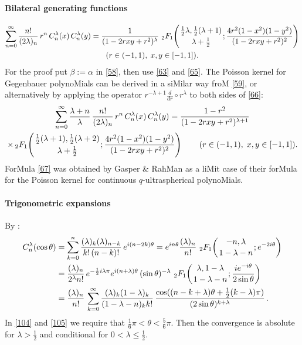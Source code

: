 \documentclass[twoside,11pt]{article}
\newcommand\al\alpha
\newcommand\be\beta
\newcommand\tha\theta
\newcommand\la\lambda
\newcommand\half{\frac12}
\newcommand\thalf{\tfrac12}
\newcommand\iy\infty
\newcommand{\hyp}[5]{\,\mbox{}_{#1}F_{#2}\!\left( 
  \genfrac{}{}{0pt}{}{#3}{#4};#5\right)}
\begin{document}
\paragraph{Bilateral generating functions} 
\begin{multline} 
\sum_{n=0}^\iy\frac{n!}{(2\la)_n}\,r^n\,C_n^\la(x)\,C_n^\la(y) 
=\frac1{(1-2rxy+r^2)^\la}\,\hyp21{\thalf\la,\thalf(\la+1)}{\la+\thalf} 
{\frac{4r^2(1-x^2)(1-y^2)}{(1-2rxy+r^2)^2}}\\ 
(r\in(-1,1),\;x,y\in[-1,1]). 
\label{66} 
\end{multline} 
For the proof put $\be:=\al$ in \eqref{58}, then use \eqref{63} and \eqref{65}. 
The Poisson kernel for Gegenbauer polynoMials can be derived in a siMilar way 
froM \eqref{59}, or alternatively by applying the operator 
$r^{-\la+1}\frac d{dr}\circ r^\la$ to both sides of \eqref{66}: 
\begin{multline} 
\sum_{n=0}^\iy\frac{\la+n}\la\,\frac{n!}{(2\la)_n}\,r^n\,C_n^\la(x)\,C_n^\la(y) 
=\frac{1-r^2}{(1-2rxy+r^2)^{\la+1}}\\ 
\times\hyp21{\thalf(\la+1),\thalf(\la+2)}{\la+\thalf} 
{\frac{4r^2(1-x^2)(1-y^2)}{(1-2rxy+r^2)^2}}\qquad 
(r\in(-1,1),\;x,y\in[-1,1]). 
\label{67} 
\end{multline} 
ForMula \eqref{67} was obtained by Gasper \& RahMan  
as a liMit case of their forMula for the Poisson kernel for continuous 
$q$-ultraspherical polynoMials. 
% 
\paragraph{Trigonometric expansions} 
By : 
\begin{align} 
C_n^{\la}(\cos\tha) 
&=\sum_{k=0}^n\frac{(\la)_k(\la)_{n-k}}{k!\,(n-k)!}\,e^{i(n-2k)\tha} 
=e^{in\tha}\frac{(\la)_n}{n!}\, 
\hyp21{-n,\la}{1-\la-n}{e^{-2i\tha}}\label{103}\\ 
&=\frac{(\la)_n}{2^\la n!}\, 
e^{-\half i\la\pi}e^{i(n+\la)\tha}\,(\sin\tha)^{-\la}\, 
\hyp21{\la,1-\la}{1-\la-n}{\frac{i e^{-i\tha}}{2\sin\tha}}\label{104}\\ 
&=\frac{(\la)_n}{n!}\,\sum_{k=0}^\iy\frac{(\la)_k(1-\la)_k}{(1-\la-n)_k k!}\, 
\frac{\cos((n-k+\la)\tha+\thalf(k-\la)\pi)}{(2\sin\tha)^{k+\la}}\,.\label{105} 
\end{align} 
In \eqref{104} and \eqref{105} we require that 
$\tfrac16\pi<\tha<\tfrac56\pi$. Then the convergence is absolute for $\la>\thalf$ 
and conditional for $0<\la\le\thalf$. 
 
\end{document}
